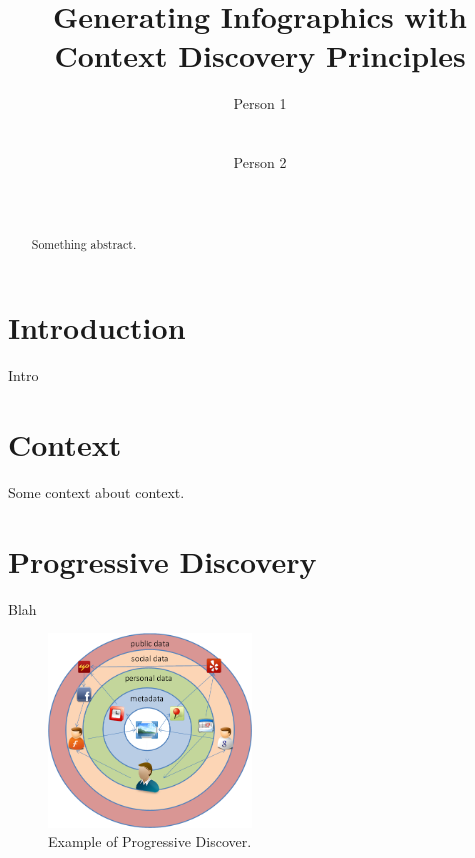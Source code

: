 \documentclass{sig-alternate}
\begin{document}
\title{Generating Infographics with Context Discovery Principles}

\author{
\alignauthor
Person 1\\
       \\
       \\
\alignauthor
Person 2\\
       \\
       \\
}


\maketitle
\begin{abstract}
Something abstract.
\end{abstract}



\section{Introduction}
Intro

\section{Context}
Some context about context.

\section{Progressive Discovery}
Blah \cite{westermann2007toward, gupta2011managing}



\begin{figure}[t]
\centering
\includegraphics[width=0.48\textwidth]{media/prog-discovery.png}
\caption{Example of Progressive Discover.}
\label{fig:cuenet-arch}
\end{figure}



\end{document}
